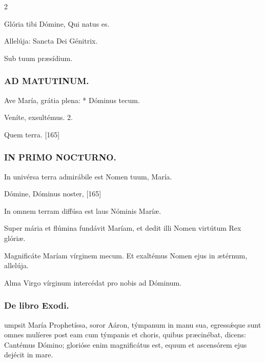 \documentclass[9pt,twoside]{extarticle}
\begin{document}
\begin{multicols}{2}
\begin{tightlist}{}
\item {} Glória tibi Dómine, Qui natus es.
\item {} Allelúja: Sancta Dei Génitrix.
\item {} Sub tuum præsídium.
\end{tightlist}

\subsubsection*{\center \textsc{AD MATUTINUM.}}
\begin{tightlist}{}
\item {} Ave María, grátia plena: * Dóminus tecum.
\item {} Veníte, exsultémus. 2.
\item {} Quem terra. [165]
\end{tightlist}

\subsubsection*{\center \textsc{IN PRIMO NOCTURNO.}}
\begin{tightlist}{}
\item {} In univérsa terra admirábile est Nomen tuum, María.
\item {} Dómine, Dóminus noster,  [165]
\item {} In omnem terram diffúsa est laus Nóminis Maríæ.
\item {} Super mária et flúmina fundávit Maríam, et dedit illi Nomen virtútum Rex glóriæ.
\item {} Magnificáte Maríam vírginem mecum.  Et exaltémus Nomen ejus in ætérnum, allelúja.
\item {\small {} Alma Virgo vírginum intercédat pro nobis ad Dóminum.}
\end{tightlist}

\subsubsection*{\center De libro Exodi.}
\noindent {}
umpsit María Prophetíssa, soror Aáron, týmpanum in manu sua, egressǽque sunt omnes mulíeres post eam cum týmpanis et choris, quibus præcinébat, dicens: Cantémus Dómino; glorióse enim magnificátus est, equum et ascensórem ejus dejécit in mare.


\end{multicols}
\end{document}

